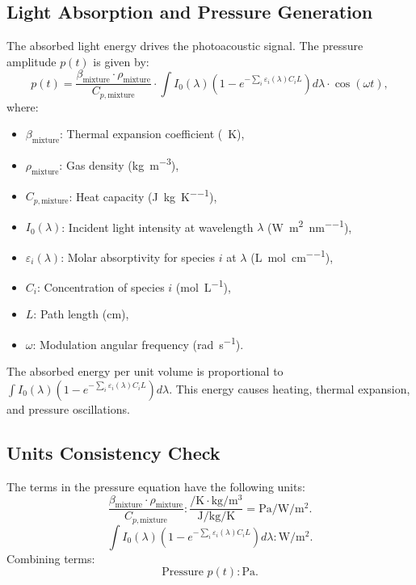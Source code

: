 \documentclass[12pt]{article}
\begin{document}
\subsection{Light Absorption and Pressure Generation}
The absorbed light energy drives the photoacoustic signal. The pressure amplitude \( p(t) \) is given by:
\[
p(t) = \frac{\beta_{\text{mixture}} \cdot \rho_{\text{mixture}}}{C_{p,\text{mixture}}} \cdot \int I_0(\lambda) \left( 1 - e^{-\sum_i \varepsilon_i(\lambda) C_i L} \right) d\lambda \cdot \cos(\omega t),
\]
where:
\begin{itemize}
    \item \( \beta_{\text{mixture}} \): Thermal expansion coefficient (\si{\per\kelvin}),
    \item \( \rho_{\text{mixture}} \): Gas density (\si{\kilogram\per\meter\cubed}),
    \item \( C_{p,\text{mixture}} \): Heat capacity (\si{\joule\per\kilogram\per\kelvin}),
    \item \( I_0(\lambda) \): Incident light intensity at wavelength \(\lambda\) (\si{\watt\per\meter\squared\per\nano\meter}),
    \item \( \varepsilon_i(\lambda) \): Molar absorptivity for species \( i \) at \(\lambda\) (\si{\liter\per\mole\per\centi\meter}),
    \item \( C_i \): Concentration of species \( i \) (\si{\mole\per\liter}),
    \item \( L \): Path length (\si{\centi\meter}),
    \item \( \omega \): Modulation angular frequency (\si{\radian\per\second}).
\end{itemize}

The absorbed energy per unit volume is proportional to \( \int I_0(\lambda) \left( 1 - e^{-\sum_i \varepsilon_i(\lambda) C_i L} \right) d\lambda \). This energy causes heating, thermal expansion, and pressure oscillations.

\subsection{Units Consistency Check}
The terms in the pressure equation have the following units:
\[
\frac{\beta_{\text{mixture}} \cdot \rho_{\text{mixture}}}{C_{p,\text{mixture}}}: \frac{\si{\per\kelvin} \cdot \si{\kilogram\per\meter\cubed}}{\si{\joule\per\kilogram\per\kelvin}} = \si{\pascal\per\watt\per\meter\squared}.
\]
\[
\int I_0(\lambda) \left( 1 - e^{-\sum_i \varepsilon_i(\lambda) C_i L} \right) d\lambda: \si{\watt\per\meter\squared}.
\]
Combining terms:
\[
\text{Pressure } p(t): \si{\pascal}.
\]
\end{document}
